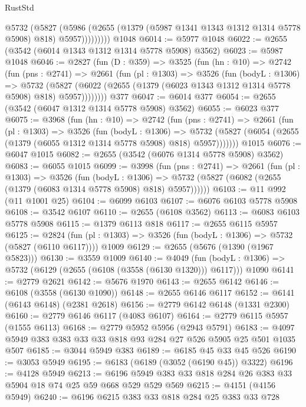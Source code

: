 \begin{lexlean}{RustStd}
\begin{coremodule}
              @5732
                (@5827
                  (@5986
                    (@2655 (@1379 (@5987 @1341 @1343 @1312 @1314 @5778 @5908) @818) @5957)))))))))
    @1048
@6014 := @5977 @1048
@6022 := @2655 (@3542 (@6014 @1343 @1312 @1314 @5778 @5908) @3562)
@6023 := @5987 @1048
@6046 := @2827
    (fun (D : @359) =>
    @3525
      (fun (hn : @10) =>
      @2742
        (fun (pns : @2741) =>
        @2661
          (fun (pl : @1303) =>
          @3526
            (fun (bodyL : @1306) =>
            @5732
              (@5827 (@6022 (@2655 (@1379 (@6023 @1343 @1312 @1314 @5778 @5908) @818) @5957))))))))
    @377
@6047 := @6014 @377
@6054 := @2655 (@3542 (@6047 @1312 @1314 @5778 @5908) @3562)
@6055 := @6023 @377
@6075 := @3968
    (fun (hn : @10) =>
    @2742
      (fun (pns : @2741) =>
      @2661
        (fun (pl : @1303) =>
        @3526
          (fun (bodyL : @1306) =>
          @5732 (@5827 (@6054 (@2655 (@1379 (@6055 @1312 @1314 @5778 @5908) @818) @5957)))))))
    @1015
@6076 := @6047 @1015
@6082 := @2655 (@3542 (@6076 @1314 @5778 @5908) @3562)
@6083 := @6055 @1015
@6099 := @3998
    (fun (pns : @2741) =>
    @2661
      (fun (pl : @1303) =>
      @3526
        (fun (bodyL : @1306) =>
        @5732 (@5827 (@6082 (@2655 (@1379 (@6083 @1314 @5778 @5908) @818) @5957))))))
@6103 := @11 @992 (@11 @1001 @25)
@6104 := @6099 @6103
@6107 := @6076 @6103 @5778 @5908
@6108 := @3542 @6107
@6110 := @2655 (@6108 @3562)
@6113 := @6083 @6103 @5778 @5908
@6115 := @1379 @6113 @818
@6117 := @2655 @6115 @5957
@6125 := @2824
    (fun (pl : @1303) => @3526 (fun (bodyL : @1306) => @5732 (@5827 (@6110 @6117))))
    @1009
@6129 := @2655 (@5676 (@1390 (@1967 @5823)))
@6130 := @3559 @1009
@6140 := @4049
    (fun (bodyL : @1306) => @5732 (@6129 (@2655 (@6108 (@3558 (@6130 @1320))) @6117)))
    @1090
@6141 := @2779 @2621
@6142 := @5676 @1970
@6143 := @2655 @6142
@6146 := @6108 (@3558 (@6130 @1090))
@6148 := @2655 @6146 @6117
@6152 := @6141 (@6143 @6148) (@2381 @2618)
@6156 := @2779 @6142 @6148 (@1331 @2300)
@6160 := @2779 @6146 @6117 (@4083 @6107)
@6164 := @2779 @6115 @5957 (@1555 @6113)
@6168 := @2779 @5952 @5956 (@2943 @5791)
@6183 := @4097 @5949 @383 @383 @33 @33 @818 @93 @284 @27 @526 @5905 @25 @501 @1035 @507
@6185 := @3044 @5949 @383
@6189 := @6185 @45 @33 @45 @526
@6190 := @3053 @5949
@6195 := @6183 (@6189 (@3052 (@6190 @45)) @3322)
@6196 := @4128 @5949
@6213 := @6196 @5949 @383 @33 @818 @284 @26 @383 @33 @5904 @18 @74 @25 @59 @668 @529 @529 @569
@6215 := @4151 (@4156 @5949)
@6240 := @6196
    @6215
    @383
    @33
    @818
    @284
    @25
    @383
    @33
    @728

\end{coremodule}
\end{lexlean}
